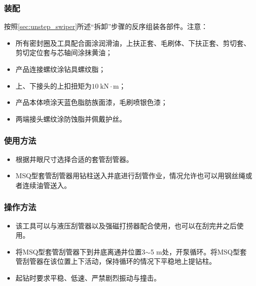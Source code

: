 \subsubsection{装配}
按照\ref{sec:unstep_swiper}所述“拆卸”步骤的反序组装各部件。注意：
\begin{itemize}
	\item 所有密封圈及工具配合面涂润滑油，上扶正套、毛刷体、下扶正套、剪切套、剪切定位套与芯轴间涂抹黄油；
	\item 产品连接螺纹涂钻具螺纹脂；
	\item 上、下接头的上扣扭矩为$10\ \mathrm{kN\cdot m}$；
	\item 产品本体喷涂天蓝色脂肪族面漆，毛刷喷银色漆；
	\item 两端接头螺纹涂防蚀脂并佩戴护丝。
	\end{itemize}
\subsubsection{使用方法}
\begin{itemize}
	\item 	根据井眼尺寸选择合适的套管刮管器。
	\item MSQ型套管刮管器用钻柱送入井底进行刮管作业，情况允许也可以用钢丝绳或者连续油管送入。
\end{itemize}
\subsubsection{操作方法}
\begin{itemize}
	\item 	该工具可以与液压刮管器以及强磁打捞器配合使用，也可以在刮完井之后使用。
	\item 	将MSQ型套管刮管器下到井底离通井位置3$\sim$5 m处，开泵循环。将MSQ型套管刮管器在该位置上下活动，保持循环的情况下平稳地上提钻柱。
	\item 	起钻时要求平稳、低速、严禁剧烈振动与撞击。
\end{itemize}

